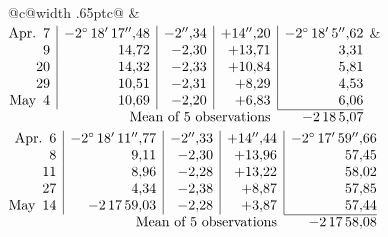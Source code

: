 \noindent\begin{tabular}{@{}c@{\hspace{.4em}\vrule width .65pt\hspace{.4em}}c@{}}
 &
 \\[.18ex]
\(\begin{array}[t]{@{}r|r|r|r|r@{}}
\text{Apr.}\enspace 7 & -2^\circ\,18'\,17''{,}48 & -2''{,}34 & +14''{,}20 & -2^\circ\,18'\,5''{,}62\\
9 & 14{,}72 & -2{,}30 & +13{,}71 & 3{,}31\\
20 & 14{,}32 & -2{,}33 & +10{,}84 & 5{,}81\\
29 & 10{,}51 & -2{,}31 & +8{,}29 & 4{,}53\\
\text{May}\enspace 4 & 10{,}69 & -2{,}20 & +6{,}83 & 6{,}06\\
\cline{5-5}
\multicolumn{4}{r}{\text{Mean of 5 observations}} & -2\,18\,5{,}07
\end{array}\)
&
\(\begin{array}[t]{@{}r|r|r|r|r@{}}
\text{Apr.}\enspace 6 & -2^\circ\,18'\,11''{,}77 & -2''{,}33 & +14''{,}44 & -2^\circ\,17'\,59''{,}66\\
8 & 9{,}11 & -2{,}30 & +13{,}96 & 57{,}45\\
11 & 8{,}96 & -2{,}28 & +13{,}22 & 58{,}02\\
27 & 4{,}34 & -2{,}38 & +8{,}87 & 57{,}85\\
\text{May}\enspace 14 & -2\,17\,59{,}03 & -2{,}28 & +3{,}87 & 57{,}44\\
\cline{5-5}
\multicolumn{4}{r}{\text{Mean of 5 observations}} & -2\,17\,58{,}08
\end{array}\)
\end{tabular}\par\medskip
